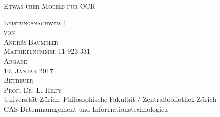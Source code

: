 

\begin{titlepage}

\begin{center}
\Large
\textsc{Etwas über Models für OCR}\\

\vspace{4cm}

\textsc{Leistungsnachweis 1\\[0.5\baselineskip]
 von\\[0.5\baselineskip]
Andrés Baumeler\\
{\normalsize \textsc{Matrikelnummer 11-923-331}}}\\

\vspace{3cm}
\textsc{Abgabe} \\
\textsc{19. Januar 2017}\\ %

\vspace{1cm}
\textsc{Betreuer\\
Prof. Dr. L. Hilty}\\

\vspace{2cm}
Universität Zürich, Philosophische Fakultät  / Zentralbibliothek Zürich\\
\normalsize{CAS Datenmanagement und Informationstechnologien}\\

\end{center}

\end{titlepage}
